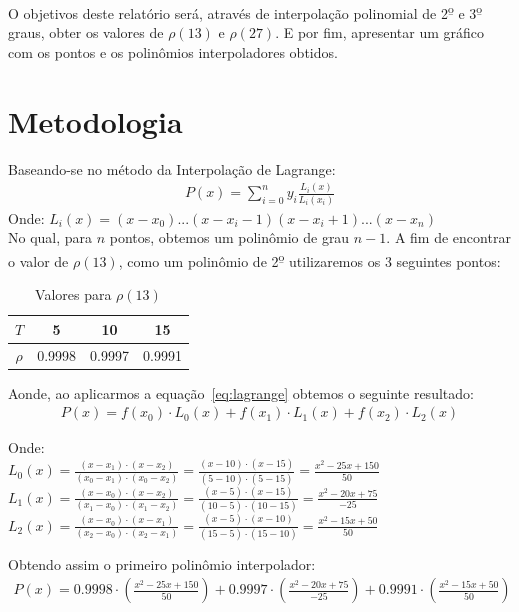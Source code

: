 \documentclass[12pt, hidelinks]{article}
\begin{document}
O objetivos deste relatório será, através de interpolação polinomial de 2\textsuperscript{\b{o}} e 3\textsuperscript{\b{o}} graus, obter os valores de $\rho(13)$ e $\rho(27)$. E por fim, apresentar um gráfico com os pontos e os polinômios interpoladores obtidos.

\section{Metodologia}
Baseando-se no método da Interpolação de Lagrange:
\begin{eqnarray}\label{eq:lagrange}
  P(x) = \sum\limits_{i=0}^{n}y_i \frac{L_i(x)}{L_i(x_i)}
\end{eqnarray}
Onde: $L_i(x) = (x - x_0) ... (x - x_i-1)(x - x_i+1) ... (x - x_n)$\\
No qual, para $n$ pontos, obtemos um polinômio de grau $n-1$. A fim de encontrar o valor de $\rho(13)$, como um polinômio de 2\textsuperscript{\b{o}} utilizaremos os 3 seguintes pontos:

\begin{table}[h]
  \centering
  \begin{tabular}{|c|c|c|c|}
    \hline
      $T$ & 5 & 10 & 15\\
    \hline
      $\rho$ & 0.9998 & 0.9997 & 0.9991\\
    \hline
  \end{tabular}
  \caption{Valores para $\rho(13)$}
  \label{tab:val13}
\end{table}

Aonde, ao aplicarmos a equação~\eqref{eq:lagrange} obtemos o seguinte resultado:
\begin{eqnarray}\label{eq:pn}
  P(x) = f(x_0)\cdot L_0(x) + f(x_1)\cdot L_1(x) + f(x_2)\cdot L_2(x)
\end{eqnarray}

Onde: \\
$L_0(x) = \frac{(x - x_1)\cdot(x - x_2)}{(x_0 - x_1)\cdot(x_0 - x_2)} = \frac{(x - 10)\cdot(x - 15)}{(5 - 10)\cdot(5 - 15)} = \frac{x^2 - 25x + 150}{50}$\\
$L_1(x) = \frac{(x - x_0)\cdot(x - x_2)}{(x_1 - x_0)\cdot(x_1 - x_2)} = \frac{(x - 5)\cdot(x - 15)}{(10 - 5)\cdot(10 - 15)} = \frac{x^2 - 20x + 75}{-25}$\\
$L_2(x) = \frac{(x - x_0)\cdot(x - x_1)}{(x_2 - x_0)\cdot(x_2 - x_1)} = \frac{(x - 5)\cdot(x - 10)}{(15 - 5)\cdot(15 - 10)} = \frac{x^2 - 15x + 50}{50}$

Obtendo assim o primeiro polinômio interpolador:
\begin{eqnarray}\label{eq:pi1}
  P(x) = 0.9998 \cdot \left(\frac{x^2 - 25x + 150}{50}\right) + 0.9997 \cdot \left(\frac{x^2 - 20x + 75}{-25}\right) + 0.9991 \cdot \left(\frac{x^2 - 15x + 50}{50}\right)
\end{eqnarray}
\end{document}
